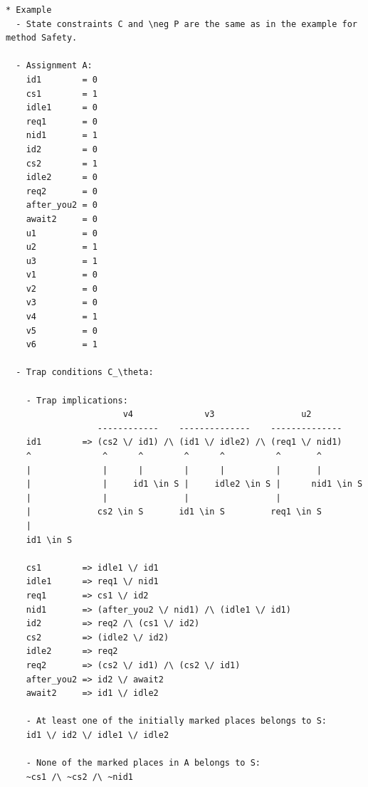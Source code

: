 \documentclass{article}
\begin{document}
\newpage
\begin{verbatim}
* Example
  - State constraints C and \neg P are the same as in the example for method Safety.

  - Assignment A:
    id1        = 0
    cs1        = 1
    idle1      = 0
    req1       = 0
    nid1       = 1
    id2        = 0
    cs2        = 1
    idle2      = 0
    req2       = 0
    after_you2 = 0
    await2     = 0
    u1         = 0
    u2         = 1
    u3         = 1
    v1         = 0
    v2         = 0
    v3         = 0
    v4         = 1
    v5         = 0
    v6         = 1

  - Trap conditions C_\theta:

    - Trap implications:
                       v4              v3                 u2
                  ------------    --------------    --------------     
    id1        => (cs2 \/ id1) /\ (id1 \/ idle2) /\ (req1 \/ nid1)
    ^              ^      ^        ^      ^          ^       ^
    |              |      |        |      |          |       |
    |              |     id1 \in S |     idle2 \in S |      nid1 \in S
    |              |               |                 |
    |             cs2 \in S       id1 \in S         req1 \in S
    |
    id1 \in S
    
    cs1        => idle1 \/ id1
    idle1      => req1 \/ nid1
    req1       => cs1 \/ id2
    nid1       => (after_you2 \/ nid1) /\ (idle1 \/ id1)
    id2        => req2 /\ (cs1 \/ id2)
    cs2        => (idle2 \/ id2)
    idle2      => req2
    req2       => (cs2 \/ id1) /\ (cs2 \/ id1)
    after_you2 => id2 \/ await2
    await2     => id1 \/ idle2

    - At least one of the initially marked places belongs to S:
    id1 \/ id2 \/ idle1 \/ idle2

    - None of the marked places in A belongs to S:
    ~cs1 /\ ~cs2 /\ ~nid1
\end{verbatim}

\newpage
\end{document}
